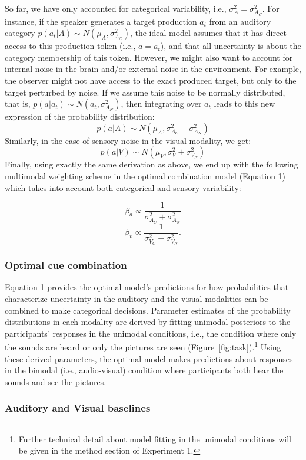 \documentclass[english,,man,floatsintext]{apa6}
\let\rmarkdownfootnote\footnote%
\def\footnote{\protect\rmarkdownfootnote}
\theoremstyle{definition}
\theoremstyle{definition}
\theoremstyle{definition}
\theoremstyle{remark}
\begin{document}
So far, we have only accounted for categorical variability, i.e.,
\(\sigma^2_{A} = \sigma^2_{A_C}\). For instance, if the speaker
generates a target production \(a_t\) from an auditory category
\(p(a_t | A) \sim N(\mu_{A}, \sigma^2_{A_C})\), the ideal model assumes
that it has direct access to this production token (i.e., \(a=a_t\)),
and that all uncertainty is about the category membership of this token.
However, we might also want to account for internal noise in the brain
and/or external noise in the environment. For example, the observer
might not have access to the exact produced target, but only to the
target perturbed by noise. If we assume this noise to be normally
distributed, that is, \(p(a | a_t) \sim N(a_t, \sigma^2_{A_N})\), then
integrating over \(a_t\) leads to this new expression of the probability
distribution:
\[ p(a | A) \sim N(\mu_{A}, \sigma^2_{A_C}+\sigma^2_{A_N})\] Similarly,
in the case of sensory noise in the visual modality, we get:
\[ p(a | V) \sim N(\mu_{V}, \sigma^2_{V}+\sigma^2_{V_N})\] Finally,
using exactly the same derivation as above, we end up with the following
multimodal weighting scheme in the optimal combination model (Equation
1) which takes into account both categorical and sensory variability:

\[\beta_a \propto \frac{1}{\sigma^2_{A_C}+\sigma^2_{A_N}}\]
\[\beta_v \propto \frac{1}{\sigma^2_{V_C} +\sigma^2_{V_N}}.\]

\subsubsection{Optimal cue combination}\label{optimal-cue-combination}

Equation 1 provides the optimal model's predictions for how
probabilities that characterize uncertainty in the auditory and the
visual modalities can be combined to make categorical decisions.
Parameter estimates of the probability distributions in each modality
are derived by fitting unimodal posteriors to the participants'
responses in the unimodal conditions, i.e., the condition where only the
sounds are heard or only the pictures are seen
(Figure~\ref{fig:task}).\footnote{Further technical detail about model fitting in the unimodal conditions will be given in the method section of Experiment 1.}
Using these derived parameters, the optimal model makes predictions
about responses in the bimodal (i.e., audio-visual) condition where
participants both hear the sounds and see the pictures.

\subsubsection{Auditory and Visual
baselines}\label{auditory-and-visual-baselines}
\end{document}
